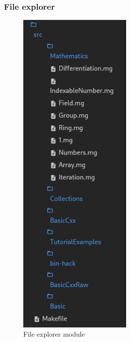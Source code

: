\begin{frame}
  \frametitle{File explorer}
  \begin{figure}
    \centering
    \includegraphics[width=0.5\textwidth]{./pics/ide-explorer.png}
    \caption{
      File explorer module
    }
  \end{figure}
\end{frame}

